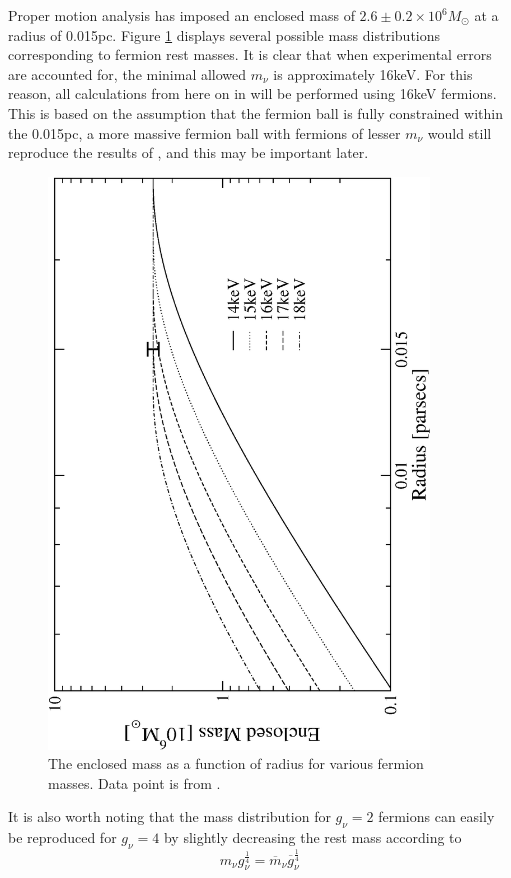 Proper motion analysis \cite{ref_ghezmotion} has imposed an enclosed mass of $2.6 \pm 0.2 \times 10^6 M_\odot$ at a radius of 0.015pc.
Figure \ref{fig_classicalfermionmass} displays several possible mass distributions corresponding to fermion rest masses. It is clear
that when experimental errors are accounted for, the minimal allowed $m_\nu$ is approximately 16keV. For this reason, all calculations
from here on in will be performed using 16keV fermions. This is based on the assumption that the fermion ball is fully constrained
within the 0.015pc, a more massive fermion ball with fermions of lesser $m_\nu$ would still reproduce the results of
\cite{ref_ghezmotion}, and this may be important later.
\begin{figure}[!tb]
	\begin{center}
	\includegraphics[angle=-90,width=0.9\textwidth]{eps/classicalfermionmass.eps}
	\caption{The enclosed mass as a function of radius for various fermion masses. Data point is from \cite{ref_ghezmotion}.}
	\label{fig_classicalfermionmass}
	\end{center}
\end{figure}
It is also worth noting that the mass distribution for $g_\nu=2$ fermions can easily be reproduced for $g_\nu=4$ by slightly
decreasing the rest mass according to
\begin{equation}
	m_\nu g_\nu^{\frac{1}{4}} = \overline{m}_\nu \overline{g}_\nu^{\frac{1}{4}}
	\label{eqn_classicalfermiondegeneracyrelation}
\end{equation}
